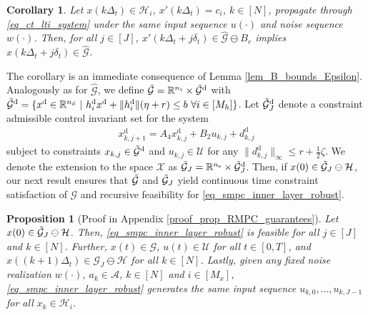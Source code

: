 \documentclass{IEEEtran}
\newtheorem{proposition}[theorem]{Proposition}
\newtheorem{corollary}[theorem]{Corollary}
\newtheorem{assumption}{Assumption}
\begin{document}
\begin{corollary}
    \label{lem_if_in_hat_then_in_tilde}
    Let $x(k\Delta_t)\in\mathcal{H}_i$, $x'(k\Delta_t)=c_i$, $k\in[N]$, propagate through \eqref{eq_ct_lti_system} under the same input sequence $u(\cdot)$ and noise sequence $w(\cdot)$. Then, for all $j\in[J]$, $x'(k\Delta_t+j\delta_t)\in\hat{\mathcal{G}}\ominus B_r$ implies $x(k\Delta_t+j\delta_t)\in\hat{\mathcal{G}}$.
\end{corollary}
The corollary is an immediate consequence of Lemma \ref{lem_B_bounds_Epsilon}. Analogously as for $\hat{\mathcal{G}}$, we define $\Tilde{\mathcal{G}}=\mathbb{R}^{n_{\text{s}}}\times \Tilde{\mathcal{G}}^{\text{d}}$ with $\Tilde{\mathcal{G}}^{\text{d}}=\{x^{\text{d}}\in\mathbb{R}^{n_{\text{d}}}\ | \ h_i^{\text{d}}x^{\text{d}}+\|h_i^{\text{d}}\|(\eta+r)\leq b \ \forall i\in[M_h]\}$. Let $\Tilde{\mathcal{G}}_J^{\text{d}}$ denote a constraint admissible control invariant set for the system 
\begin{align}
    \label{eq_discrete_time_lti_system_deterministic_subsystem_robust}
    x^{\text{d}}_{k,j+1}=A_4x^{\text{d}}_{k,j}+B_2u_{k,j}+d_{k,j}^{\text{d}}    
\end{align}
subject to constraints $x_{k,j}\in\Tilde{\mathcal{G}}^{\text{d}}$ and $u_{k,j}\in\mathcal{U}$ for any $\|d^{\text{d}}_{k,j}\|_{\infty}\leq r+ \frac{1}{2}\zeta$. We denote the extension to the space $\mathcal{X}$ as $\Tilde{\mathcal{G}}_J=\mathbb{R}^{n_{\text{s}}}\times \Tilde{\mathcal{G}}_J^{\text{d}}$. Then, if $x(0)\in\Tilde{\mathcal{G}}_J\ominus\mathcal{H}$, our next result ensures that $\Tilde{\mathcal{G}}$ and $ \Tilde{\mathcal{G}}_J$ yield continuous time constraint satisfaction of $\mathcal{G}$ and recursive feasibility for \eqref{eq_smpc_inner_layer_robust}.
\begin{proposition}[Proof in Appendix \ref{proof_prop_RMPC_guarantees}]\label{prop_RMPC_guarantees}
    Let $x(0)\in\Tilde{\mathcal{G}}_J\ominus\mathcal{H}$. Then, \eqref{eq_smpc_inner_layer_robust} is feasible for all $j\in[J]$ and $k\in[N]$. Further, ${x}(t)\in{\mathcal{G}}$, $u(t)\in\mathcal{U}$ for all $t\in [0, T]$, and ${x}((k+1)\Delta_t)\in{\mathcal{G}}_J\ominus\mathcal{H}$ for all $k\in [N]$. Lastly, given any fixed noise realization $w(\cdot)$, $a_k\in\mathcal{A}$, $k\in[N]$ and $i\in[M_x]$, \eqref{eq_smpc_inner_layer_robust} generates the same input sequence $u_{k,0},\dots,u_{k,J-1}$ for all $x_k\in\mathcal{H}_i$.
\end{proposition}
\end{document}
